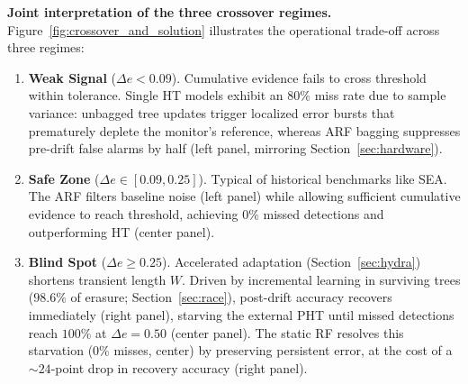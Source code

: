\documentclass[10pt,conference]{IEEEtran}
\theoremstyle{definition}
\begin{document}
\textbf{Joint interpretation of the three crossover regimes.}
Figure~\ref{fig:crossover_and_solution} illustrates the operational trade-off across three regimes:
\begin{enumerate}[nosep, leftmargin=*, label=\textbf{(R\arabic*)}]
  \item \textbf{Weak Signal} ($\Delta e < 0.09$). Cumulative evidence fails to cross threshold within tolerance. Single HT models exhibit an $80\%$ miss rate due to sample variance: unbagged tree updates trigger localized error bursts that prematurely deplete the monitor's reference, whereas ARF bagging suppresses pre-drift false alarms by half (left panel, mirroring Section~\ref{sec:hardware}).
  \item \textbf{Safe Zone} ($\Delta e \in [0.09, 0.25]$). Typical of historical benchmarks like SEA. The ARF filters baseline noise (left panel) while allowing sufficient cumulative evidence to reach threshold, achieving $0\%$ missed detections and outperforming HT (center panel).
  \item \textbf{Blind Spot} ($\Delta e \ge 0.25$). Accelerated adaptation (Section~\ref{sec:hydra}) shortens transient length $W$. Driven by incremental learning in surviving trees ($98.6\%$ of erasure; Section~\ref{sec:race}), post-drift accuracy recovers immediately (right panel), starving the external PHT until missed detections reach $100\%$ at $\Delta e = 0.50$ (center panel). The static RF resolves this starvation ($0\%$ misses, center) by preserving persistent error, at the cost of a ${\sim}24$-point drop in recovery accuracy (right panel).
\end{enumerate}
\end{document}
